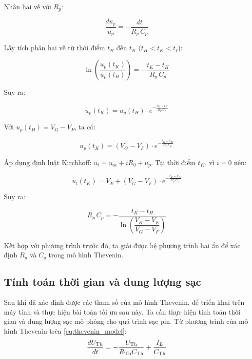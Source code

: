\documentclass{thesis}
\begin{document}
Nhân hai vế với \( R_p \):

\begin{equation}
\frac{du_p}{u_p} = -\frac{dt}{R_p\, C_p}
\end{equation}

Lấy tích phân hai vế từ thời điểm \( t_H \) đến \( t_K \) (\( t_H < t_K < t_I \)):

\begin{equation}
\ln\left( \frac{u_p(t_K)}{u_p(t_H)} \right) = -\frac{t_K - t_H}{R_p\, C_p}
\end{equation}

Suy ra:

\begin{equation}
u_p(t_K) = u_p(t_H) \cdot e^{-\frac{t_K - t_H}{R_p\, C_p}}
\end{equation}

Với \( u_p(t_H) = V_G - V_F \), ta có:

\begin{equation}
u_p(t_K) = (V_G - V_F) \cdot e^{-\frac{t_K - t_H}{R_p\, C_p}}
\end{equation}

Áp dụng định luật Kirchhoff: \( u_t = u_{oc} + i R_0 + u_p \). Tại thời điểm \( t_K \), vì \( i = 0 \) nên:

\begin{equation}
u_t(t_K) = V_E + (V_G - V_F) \cdot e^{-\frac{t_K - t_H}{R_p\, C_p}}
\end{equation}

Suy ra:

\begin{equation}
R_p\, C_p = -\frac{t_K - t_H}{\ln \left( \dfrac{V_K - V_E}{V_G - V_F} \right)}
\end{equation}

Kết hợp với phương trình trước đó, ta giải được hệ phương trình hai ẩn để xác định \( R_p \) và \( C_p \) trong mô hình Thevenin.

\subsection{Tính toán thời gian và dung lượng sạc}
Sau khi đã xác định được các tham số của mô hình Thevenin, để triển khai trên máy tính và thực hiện bài toán tối ưu sau này. Ta cần thực hiện tính toán thời gian và dung lượng sạc mô phỏng cho quá trình sạc pin.
Từ phương trình của mô hình Thevenin trên \ref{eq:thevenin_model}:
\begin{equation*}
\dfrac{d{U}_{\mathrm{Th}}}{dt} = -\dfrac{U_{\mathrm{Th}}}{R_{\mathrm{Th}}C_{\mathrm{Th}}} + \dfrac{I_L}{C_{\mathrm{Th}}}\\ 
\label{eq:thevenin_model-eq}
\end{equation*}
\end{document}
